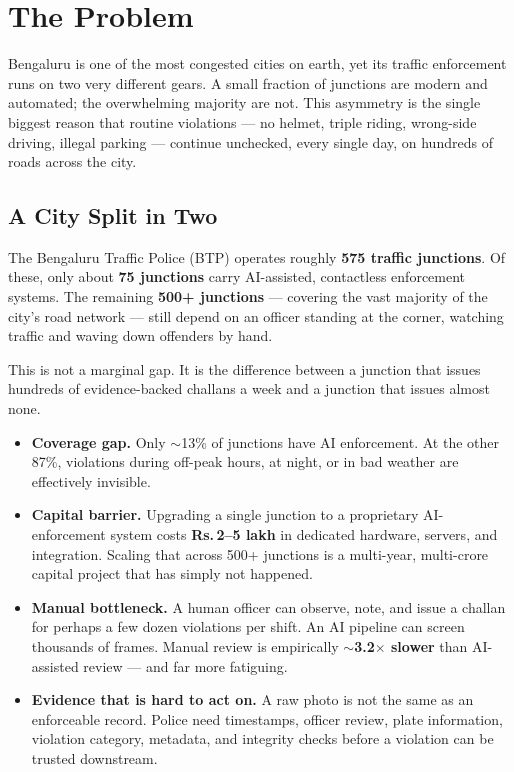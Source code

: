 \documentclass[11pt,a4paper]{article}
\newcommand{\sectionrule}{\noindent{\color{vigilaccent}\rule{0.22\linewidth}{2.2pt}}{\color{vigilaccent!30}\rule{0.78\linewidth}{0.6pt}}\par\vspace{4pt}}
\begin{document}
\setcounter{page}{1}

\section{The Problem}
\sectionrule

Bengaluru is one of the most congested cities on earth, yet its traffic enforcement runs on two very different gears. A small fraction of junctions are modern and automated; the overwhelming majority are not. This asymmetry is the single biggest reason that routine violations — no helmet, triple riding, wrong-side driving, illegal parking — continue unchecked, every single day, on hundreds of roads across the city.

\subsection{A City Split in Two}

The Bengaluru Traffic Police (BTP) operates roughly \textbf{575 traffic junctions}. Of these, only about \textbf{75 junctions} carry AI-assisted, contactless enforcement systems. The remaining \textbf{500+ junctions} — covering the vast majority of the city's road network — still depend on an officer standing at the corner, watching traffic and waving down offenders by hand.

This is not a marginal gap. It is the difference between a junction that issues hundreds of evidence-backed challans a week and a junction that issues almost none.

\begin{itemize}
  \item \textbf{Coverage gap.} Only $\sim$13\% of junctions have AI enforcement. At the other 87\%, violations during off-peak hours, at night, or in bad weather are effectively invisible.
  \item \textbf{Capital barrier.} Upgrading a single junction to a proprietary AI-enforcement system costs \textbf{Rs.\,2--5 lakh} in dedicated hardware, servers, and integration. Scaling that across 500+ junctions is a multi-year, multi-crore capital project that has simply not happened.
  \item \textbf{Manual bottleneck.} A human officer can observe, note, and issue a challan for perhaps a few dozen violations per shift. An AI pipeline can screen thousands of frames. Manual review is empirically \textbf{$\sim$3.2$\times$ slower} than AI-assisted review — and far more fatiguing.
  \item \textbf{Evidence that is hard to act on.} A raw photo is not the same as an enforceable record. Police need timestamps, officer review, plate information, violation category, metadata, and integrity checks before a violation can be trusted downstream.
\end{itemize}
\end{document}
